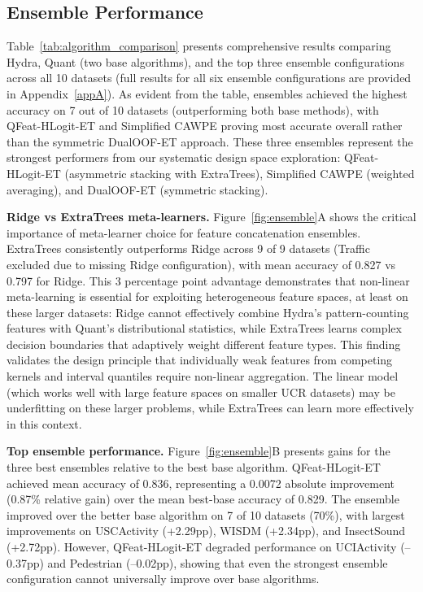 \documentclass[pdflatex,sn-basic]{sn-jnl}           %
\theoremstyle{thmstyleone}%
\theoremstyle{thmstyletwo}%
\theoremstyle{thmstylethree}%
\begin{document}
\subsection{Ensemble Performance}

Table~\ref{tab:algorithm_comparison} presents comprehensive results comparing Hydra, Quant (two base algorithms), and the top three ensemble configurations across all 10 datasets (full results for all six ensemble configurations are provided in Appendix~\ref{appA}). As evident from the table, ensembles achieved the highest accuracy on 7 out of 10 datasets (outperforming both base methods), with QFeat-HLogit-ET and Simplified CAWPE proving most accurate overall rather than the symmetric DualOOF-ET approach. These three ensembles represent the strongest performers from our systematic design space exploration: QFeat-HLogit-ET (asymmetric stacking with ExtraTrees), Simplified CAWPE (weighted averaging), and DualOOF-ET (symmetric stacking).



\textbf{Ridge vs ExtraTrees meta-learners.} Figure~\ref{fig:ensemble}A shows the critical importance of meta-learner choice for feature concatenation ensembles. ExtraTrees consistently outperforms Ridge across 9 of 9 datasets (Traffic excluded due to missing Ridge configuration), with mean accuracy of 0.827 vs 0.797 for Ridge. This 3 percentage point advantage demonstrates that non-linear meta-learning is essential for exploiting heterogeneous feature spaces, at least on these larger datasets: Ridge cannot effectively combine Hydra's pattern-counting features with Quant's distributional statistics, while ExtraTrees learns complex decision boundaries that adaptively weight different feature types. This finding validates the design principle that individually weak features from competing kernels and interval quantiles require non-linear aggregation. The linear model (which works well with large feature spaces on smaller UCR datasets) may be underfitting on these larger problems, while ExtraTrees can learn more effectively in this context.

\textbf{Top ensemble performance.} Figure~\ref{fig:ensemble}B presents gains for the three best ensembles relative to the best base algorithm. QFeat-HLogit-ET achieved mean accuracy of 0.836, representing a 0.0072 absolute improvement (0.87\% relative gain) over the mean best-base accuracy of 0.829. The ensemble improved over the better base algorithm on 7 of 10 datasets (70\%), with largest improvements on USCActivity (+2.29pp), WISDM (+2.34pp), and InsectSound (+2.72pp). However, QFeat-HLogit-ET degraded performance on UCIActivity (--0.37pp) and Pedestrian (--0.02pp), showing that even the strongest ensemble configuration cannot universally improve over base algorithms.
\end{document}
